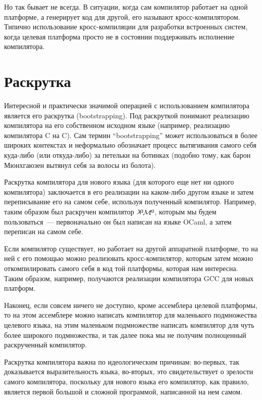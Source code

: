 \documentclass{article}
\newcommand{\lama}{$\lambda\kern -.1667em\lower -.5ex\hbox{$a$}\kern -.1000em\lower .2ex\hbox{$\mathcal M$}\kern -.1000em\lower -.5ex\hbox{$a$}$\xspace}
\begin{document}
Но так бывает не всегда. В ситуации, когда сам компилятор работает на одной платформе, а генерирует код для другой, его
называют кросс-компилятором. Типично использование кросс-компиляции для разработки встроенных систем, когда целевая платформа
просто не в состоянии поддерживать исполнение компилятора. 

\section{Раскрутка}

Интересной и практически значимой операцией с использованием компилятора является его раскрутка (bootstrapping).
Под раскруткой понимают реализацию компилятора на его собственном исходном языке (например, реализацию компилятора C на C). Сам термин
``bootstrapping'' может использоваться в более широких контекстах и неформально обозначает процесс вытягивания самого себя куда-либо
(или откуда-либо) за петельки на ботинках (подобно тому, как барон Мюнхгаюзен вытянул себя за волосы из болота).

Раскрутка компилятора для нового языка (для которого еще нет ни одного компилятора) заключается в его реализации на каком-либо
другом языке и затем переписывание его на самом себе, используя полученный компилятор. Например, таким образом был раскручен компилятор \lama,
которым мы будем пользоваться~--- первоначально он был написан на языке OCaml, а затем переписан на самом себе.

Если компилятор существует, но работает на другой аппаратной платформе, то на ней с его помощью можно реализовать кросс-компилятор,
которым затем можно откомпилировать самого себя в код той платформы, которая нам интересна. Таким образом, например, получаются
реализации компилятора GCC для новых платформ.

Наконец, если совсем ничего не доступно, кроме ассемблера целевой платформы, то на этом ассемблере можно написать компилятор для
маленького подмножества целевого языка, на этим маленьком подмножестве написать компилятор для чуть более широкого подмножества, и
так далее пока мы не получим полноценный раскрученный компилятор.

Раскрутка компилятора важна по идеологическим причинам: во-первых, так доказывается выразительность языка, во-вторых, это
свидетельствует о зрелости самого компилятора, поскольку для нового языка его компилятор, как правило, является первой большой и сложной программой,
написанной на нем самом.
  
\end{document}
